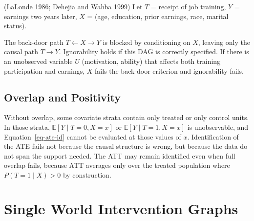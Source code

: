 \documentclass[
  a4paper,
]{book}
\newcommand{\E}{\mathbb{E}}
\begin{document}
\begin{tcolorbox}[enhanced jigsaw, arc=.35mm, bottomrule=.15mm, bottomtitle=1mm, breakable, colback=white, colbacktitle=quarto-callout-note-color!10!white, colframe=quarto-callout-note-color-frame, coltitle=black, left=2mm, leftrule=.75mm, opacityback=0, opacitybacktitle=0.6, rightrule=.15mm, title={Example: Labor Training Program}, titlerule=0mm, toprule=.15mm, toptitle=1mm]

(LaLonde 1986; Dehejia and Wahba 1999) Let \(T\) = receipt of job
training, \(Y\) = earnings two years later, \(X\) = (age, education,
prior earnings, race, marital status).

The back-door path \(T \leftarrow X \to Y\) is blocked by conditioning
on \(X\), leaving only the causal path \(T \to Y\). Ignorability holds
if this DAG is correctly specified. If there is an unobserved variable
\(U\) (motivation, ability) that affects both training participation and
earnings, \(X\) fails the back-door criterion and ignorability fails.

\end{tcolorbox}

\subsection{Overlap and Positivity}\label{overlap-and-positivity}

\begin{tcolorbox}[enhanced jigsaw, arc=.35mm, bottomrule=.15mm, bottomtitle=1mm, breakable, colback=white, colbacktitle=quarto-callout-warning-color!10!white, colframe=quarto-callout-warning-color-frame, coltitle=black, left=2mm, leftrule=.75mm, opacityback=0, opacitybacktitle=0.6, rightrule=.15mm, title={Why Overlap Is Non-Negotiable}, titlerule=0mm, toprule=.15mm, toptitle=1mm]

Without overlap, some covariate strata contain only treated or only
control units. In those strata, \(\E[Y \mid T{=}0, X{=}x]\) or
\(\E[Y \mid T{=}1, X{=}x]\) is unobservable, and
Equation~\ref{eq-ate-id} cannot be evaluated at those values of \(x\).
Identification of the ATE fails not because the causal structure is
wrong, but because the data do not span the support needed. The ATT may
remain identified even when full overlap fails, because ATT averages
only over the treated population where \(P(T{=}1 \mid X) > 0\) by
construction.

\end{tcolorbox}

\section{Single World Intervention Graphs}\label{sec-swig}
\end{document}
